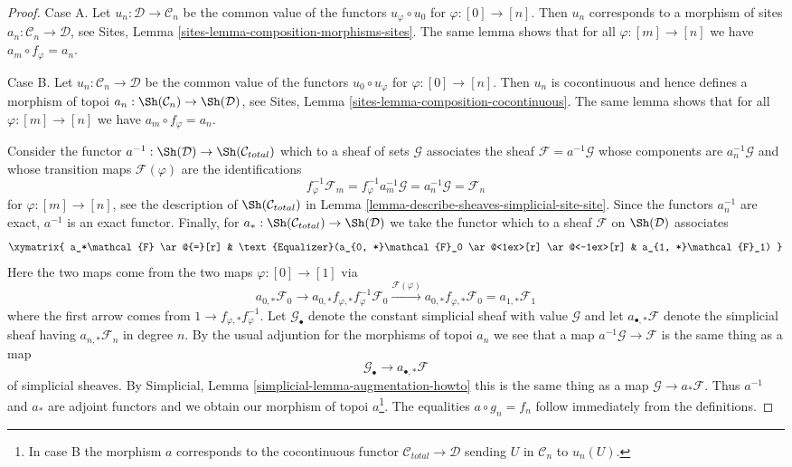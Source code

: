 \begin{proof}
Case A. Let $u_n : \mathcal{D} \to \mathcal{C}_n$ be the common
value of the functors $u_\varphi \circ u_0$ for $\varphi : [0] \to [n]$.
Then $u_n$ corresponds to a morphism of sites
$a_n : \mathcal{C}_n \to \mathcal{D}$, see
Sites, Lemma \ref{sites-lemma-composition-morphisms-sites}.
The same lemma shows that for all $\varphi : [m] \to [n]$ we have
$a_m \circ f_\varphi = a_n$.

\medskip\noindent
Case B. Let $u_n : \mathcal{C}_n \to \mathcal{D}$ be the common
value of the functors $u_0 \circ u_\varphi$ for $\varphi : [0] \to [n]$.
Then $u_n$ is cocontinuous and hence defines a morphism of topoi
$a_n : \Sh(\mathcal{C}_n) \to \Sh(\mathcal{D)}$, see
Sites, Lemma \ref{sites-lemma-composition-cocontinuous}.
The same lemma shows that for all $\varphi : [m] \to [n]$ we have
$a_m \circ f_\varphi = a_n$.

\medskip\noindent
Consider the functor $a^{-1} : \Sh(\mathcal{D}) \to \Sh(\mathcal{C}_{total})$
which to a sheaf of sets $\mathcal{G}$ associates the sheaf
$\mathcal{F} = a^{-1}\mathcal{G}$ whose components are $a_n^{-1}\mathcal{G}$
and whose transition maps $\mathcal{F}(\varphi)$ are the identifications
$$
f_\varphi^{-1}\mathcal{F}_m =
f_\varphi^{-1} a_m^{-1}\mathcal{G} =
a_n^{-1}\mathcal{G} =
\mathcal{F}_n
$$
for $\varphi : [m] \to [n]$, see the description of
$\Sh(\mathcal{C}_{total})$ in
Lemma \ref{lemma-describe-sheaves-simplicial-site-site}.
Since the functors $a_n^{-1}$ are exact, $a^{-1}$ is an exact functor.
Finally, for $a_* : \Sh(\mathcal{C}_{total}) \to \Sh(\mathcal{D})$
we take the functor which to a sheaf $\mathcal{F}$ on $\Sh(\mathcal{D})$
associates
$$
\xymatrix{
a_*\mathcal{F} \ar@{=}[r] &
\text{Equalizer}(a_{0, *}\mathcal{F}_0
\ar@<1ex>[r] \ar@<-1ex>[r] &
a_{1, *}\mathcal{F}_1)
}
$$
Here the two maps come from the two maps $\varphi : [0] \to [1]$
via
$$
a_{0, *}\mathcal{F}_0 \to
a_{0, *}f_{\varphi, *} f_\varphi^{-1}\mathcal{F}_0
\xrightarrow{\mathcal{F}(\varphi)}
a_{0, *}f_{\varphi, *} \mathcal{F}_0 = a_{1, *}\mathcal{F}_1
$$
where the first arrow comes from $1 \to f_{\varphi, *} f_\varphi^{-1}$.
Let $\mathcal{G}_\bullet$ denote the constant simplicial sheaf
with value $\mathcal{G}$ and let $a_{\bullet, *}\mathcal{F}$
denote the simplicial sheaf having $a_{n, *}\mathcal{F}_n$ in degree $n$.
By the usual adjuntion for the morphisms of topoi $a_n$ we see that
a map $a^{-1}\mathcal{G} \to \mathcal{F}$
is the same thing as a map
$$
\mathcal{G}_\bullet \longrightarrow a_{\bullet, *}\mathcal{F}
$$
of simplicial sheaves.
By Simplicial, Lemma \ref{simplicial-lemma-augmentation-howto}
this is the same thing as a map $\mathcal{G} \to a_*\mathcal{F}$.
Thus $a^{-1}$ and $a_*$ are adjoint functors and we obtain
our morphism of topoi $a$\footnote{In case B the morphism $a$
corresponds to the cocontinuous functor
$\mathcal{C}_{total} \to \mathcal{D}$ sending
$U$ in $\mathcal{C}_n$ to $u_n(U)$.}. The equalities
$a \circ g_n = f_n$ follow immediately from the definitions.
\end{proof}




